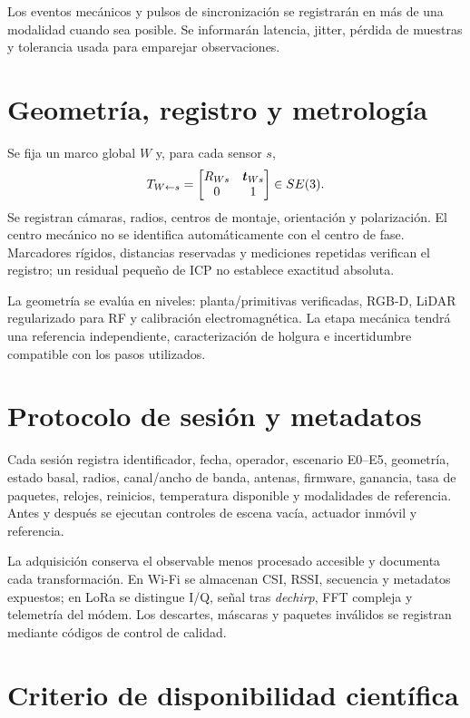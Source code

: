 Los eventos mecánicos y pulsos de sincronización se registrarán en más de una modalidad cuando sea posible. Se informarán latencia, jitter, pérdida de muestras y tolerancia usada para emparejar observaciones.

\section{Geometría, registro y metrología}

Se fija un marco global $W$ y, para cada sensor $s$,
\begin{equation}
T_{W\leftarrow s}=\begin{bmatrix}R_{Ws}&\bm{t}_{Ws}\\0&1\end{bmatrix}\in SE(3).
\label{eq:platform_extrinsics}
\end{equation}
Se registran cámaras, radios, centros de montaje, orientación y polarización. El centro mecánico no se identifica automáticamente con el centro de fase. Marcadores rígidos, distancias reservadas y mediciones repetidas verifican el registro; un residual pequeño de ICP no establece exactitud absoluta.

La geometría se evalúa en niveles: planta/primitivas verificadas, RGB-D, LiDAR regularizado para RF y calibración electromagnética. La etapa mecánica tendrá una referencia independiente, caracterización de holgura e incertidumbre compatible con los pasos utilizados.

\section{Protocolo de sesión y metadatos}

Cada sesión registra identificador, fecha, operador, escenario E0--E5, geometría, estado basal, radios, canal/ancho de banda, antenas, firmware, ganancia, tasa de paquetes, relojes, reinicios, temperatura disponible y modalidades de referencia. Antes y después se ejecutan controles de escena vacía, actuador inmóvil y referencia.

La adquisición conserva el observable menos procesado accesible y documenta cada transformación. En Wi-Fi se almacenan CSI, RSSI, secuencia y metadatos expuestos; en LoRa se distingue I/Q, señal tras \emph{dechirp}, FFT compleja y telemetría del módem. Los descartes, máscaras y paquetes inválidos se registran mediante códigos de control de calidad.

\section{Criterio de disponibilidad científica}

